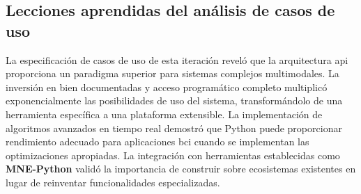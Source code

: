 \begin{table}[H]
\centering
{}
\caption{Trazabilidad requisitos-casos de uso - Tercera iteración}
\label{tab:trazabilidad_it3}
\end{table}

\subsection{Lecciones aprendidas del análisis de casos de uso}
\label{subsec:lecciones_aprendidas_it3}

La especificación de casos de uso de esta iteración reveló que la arquitectura \acrshort{api} proporciona un paradigma superior para sistemas complejos multimodales. La inversión en  bien documentadas y acceso programático completo multiplicó exponencialmente las posibilidades de uso del sistema, transformándolo de una herramienta específica a una plataforma extensible. La implementación de algoritmos avanzados en tiempo real demostró que Python puede proporcionar rendimiento adecuado para aplicaciones \acrshort{bci} cuando se implementan las optimizaciones apropiadas. La integración con herramientas establecidas como \textbf{MNE-Python} validó la importancia de construir sobre ecosistemas existentes en lugar de reinventar funcionalidades especializadas.

